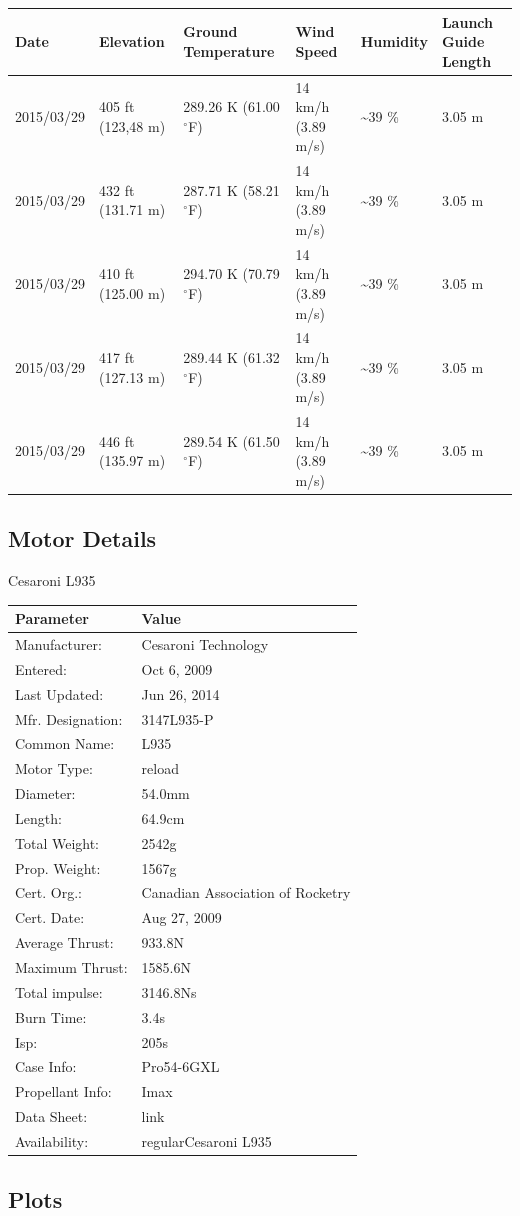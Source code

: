 \documentclass[]{article}
\begin{document}
\begin{longtable}[c]{@{}llllll@{}}
\toprule
Date & Elevation & Ground Temperature & Wind Speed & Humidity & Launch
Guide Length\tabularnewline
\midrule
\endhead
2015/03/29 & 405 ft (123,48 m) & 289.26 K (61.00 \(^\circ\)F) & 14 km/h
(3.89 m/s) & \textasciitilde{}39 \% & 3.05 m\tabularnewline
2015/03/29 & 432 ft (131.71 m) & 287.71 K (58.21 \(^\circ\)F) & 14 km/h
(3.89 m/s) & \textasciitilde{}39 \% & 3.05 m\tabularnewline
2015/03/29 & 410 ft (125.00 m) & 294.70 K (70.79 \(^\circ\)F) & 14 km/h
(3.89 m/s) & \textasciitilde{}39 \% & 3.05 m\tabularnewline
2015/03/29 & 417 ft (127.13 m) & 289.44 K (61.32 \(^\circ\)F) & 14 km/h
(3.89 m/s) & \textasciitilde{}39 \% & 3.05 m\tabularnewline
2015/03/29 & 446 ft (135.97 m) & 289.54 K (61.50 \(^\circ\)F) & 14 km/h
(3.89 m/s) & \textasciitilde{}39 \% & 3.05 m\tabularnewline
\bottomrule
\end{longtable}

\clearpage

\subsection{Motor Details}\label{motor-details}

Cesaroni L935

\begin{longtable}[c]{@{}ll@{}}
\toprule
Parameter & Value\tabularnewline
\midrule
\endhead
Manufacturer: & Cesaroni Technology\tabularnewline
Entered: & Oct 6, 2009\tabularnewline
Last Updated: & Jun 26, 2014\tabularnewline
Mfr. Designation: & 3147L935-P\tabularnewline
Common Name: & L935\tabularnewline
Motor Type: & reload\tabularnewline
Diameter: & 54.0mm\tabularnewline
Length: & 64.9cm\tabularnewline
Total Weight: & 2542g\tabularnewline
Prop. Weight: & 1567g\tabularnewline
Cert. Org.: & Canadian Association of Rocketry\tabularnewline
Cert. Date: & Aug 27, 2009\tabularnewline
Average Thrust: & 933.8N\tabularnewline
Maximum Thrust: & 1585.6N\tabularnewline
Total impulse: & 3146.8Ns\tabularnewline
Burn Time: & 3.4s\tabularnewline
Isp: & 205s\tabularnewline
Case Info: & Pro54-6GXL\tabularnewline
Propellant Info: & Imax\tabularnewline
Data Sheet: & link\tabularnewline
Availability: & regularCesaroni L935\tabularnewline
\bottomrule
\end{longtable}

\clearpage

\subsection{Plots}\label{plots}
\end{document}
